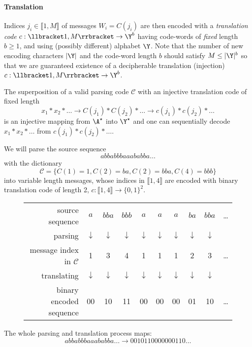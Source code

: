 \documentclass[toc]{../cs-classes/cs-classes}
\begin{document}
\paragraph*{Translation} Indices $j_i\in\llbracket 1, M\rrbracket$ of messages $W_i = C(j_i)$ are then encoded with a \emph{translation code} $c:\llbracket 1, M\rrbracket\to \Y^b$ having code-words of \emph{fixed} length $b\geq1$, and using (possibly different) alphabet $\Y$. Note that the number of new encoding characters $|\Y|$ and the code-word length $b$ should satisfy $M\leq|\Y|^b$ so that we are guaranteed existence of a decipherable translation (injection) $c:\llbracket 1, M\rrbracket\to\Y^b$.

The superposition of a valid parsing code $\mathcal{C}$ with an injective translation code of fixed length
\begin{equation*}
    x_1*x_2*\dots \longrightarrow C(j_1)*C(j_2)*\dots \longrightarrow c(j_1)*c(j_2)*\dots
\end{equation*}
is an injective mapping from $\A^\star$ into $\Y^\star$ and one can sequentially decode $x_1*x_2*\dots$ from $c(j_1)*c(j_2)*\dots$.

\begin{example}
    We will parse the source sequence
    \begin{equation*}
        abbabbbaaababba\dots
    \end{equation*}
    with the dictionary
    \begin{equation*}
        \mathcal{C} = \{C(1) = 1, C(2)=ba, C(2)=bba, C(4)=bbb\}
    \end{equation*}
    into variable length messages, whose indices in $\llbracket 1, 4\rrbracket$ are encoded with binary translation code of length 2, $c:\llbracket 1, 4\rrbracket \to \{0, 1\}^2$.

    \begin{figure}[!ht]
        \centering
        \renewcommand{\arraystretch}{1.3}
        \begin{tabular}{r c c c c c c c c c}
            source sequence&$a$&$bba$&$bbb$&$a$&$a$&$a$&$ba$&$bba$&\dots\\
            parsing&$\downarrow$&$\downarrow$&$\downarrow$&$\downarrow$&$\downarrow$&$\downarrow$&$\downarrow$&$\downarrow$\\
            message index in $\mathcal{C}$&1&3&4&1&1&1&2&3&\dots\\
            translating&$\downarrow$&$\downarrow$&$\downarrow$&$\downarrow$&$\downarrow$&$\downarrow$&$\downarrow$&$\downarrow$\\
            binary encoded sequence&00&10&11&00&00&00&01&10&\dots
        \end{tabular}
    \end{figure}

    The whole parsing and translation process maps:
    \begin{equation*}
        abbabbbaaababba\dots \longrightarrow 0010110000000110\dots
    \end{equation*}
\end{example}
\end{document}
